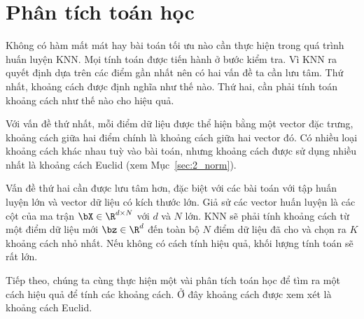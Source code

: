 



\section{Phân tích toán học}
Không có hàm mất mát hay bài toán tối ưu nào cần thực hiện trong quá trình
huấn luyện KNN. Mọi tính toán được tiến hành ở bước kiểm tra. Vì KNN ra quyết
định dựa trên các điểm gần nhất nên có hai vấn đề ta cần lưu tâm. Thứ nhất,
khoảng cách được định nghĩa như thế nào. Thứ hai, cần phải tính toán khoảng cách
như thế nào cho hiệu quả.

Với vấn đề thứ nhất, mỗi điểm dữ liệu được thể hiện bằng một vector đặc trưng,
khoảng cách giữa hai điểm chính là khoảng cách giữa hai vector đó. Có nhiều loại khoảng cách khác nhau tuỳ vào bài toán, nhưng khoảng cách được sử dụng nhiều nhất là khoảng cách Euclid (xem Mục~\ref{sec:2_norm}). 


Vấn đề thứ hai cần được lưu tâm hơn, đặc biệt với {các bài toán với tập huấn
luyện lớn và vector dữ liệu có kích thước lớn}. Giả sử các vector huấn luyện là
các cột của ma trận $\bX\in \R^{d\times N}$ với $d$ và $N$ lớn. KNN sẽ phải tính khoảng cách từ một điểm dữ liệu mới $\bz \in \R^{d}$ đến toàn bộ $N$ điểm
dữ liệu đã cho và chọn ra $K$ khoảng cách nhỏ nhất. Nếu không có cách tính hiệu
quả, khối lượng tính toán sẽ rất lớn.

Tiếp theo, chúng ta cùng thực hiện một vài phân tích toán học để tìm ra một cách hiệu quả để tính các khoảng cách. Ở đây khoảng cách được xem xét là khoảng cách Euclid.
